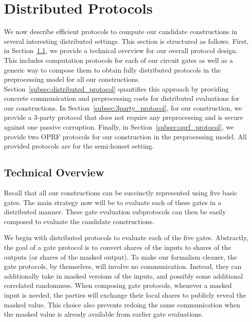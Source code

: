 \newpage
\section{Distributed Protocols}
\label{sec:distributed_protocols}
We now describe efficient protocols to compute our candidate constructions in several interesting distributed settings. This section is structured as follows. First, in Section~\ref{subsec:protocol_overview}, we provide a technical overview for our overall protocol design. This includes computation protocols for each of our circuit gates as well as a generic way to compose them to obtain fully distributed protocols in the preprocessing model for all our constructions. Section~\ref{subsec:distributed_protocol} quantifies this approach by providing concrete communication and preprocessing costs for distributed evaluations for our constructions. In Section~\ref{subsec:3party_protocol}, for our \ttwPRF construction, we provide a 3-party protocol that does not require any preprocessing and is secure against one passive corruption. Finally, in Section~\ref{subsec:oprf_protocol}, we provide two OPRF protocols for our \ttwPRF construction in the preprocessing model. All provided protocols are for the semi-honest setting.

\subsection{Technical Overview}
\label{subsec:protocol_overview}
Recall that all our constructions can be succinctly represented using five basic gates. The main strategy now will be to evaluate each of these gates in a distributed manner. These gate evaluation subprotocols can then be easily composed to evaluate the  candidate constructions. 

We begin with distributed protocols to evaluate each of the five gates. Abstractly, the goal of a gate protocol is to convert shares of the inputs to shares of the outputs (or shares of the masked output). To make our formalism cleaner, the gate protocols, by themselves, will involve no communication. Instead, they can additionally take in masked versions of the inputs, and possibly some additional correlated randomness. When composing gate protocols, whenever a masked input is needed, the parties will exchange their local shares to publicly reveal the masked value. This choice also prevents redoing the same communication when the masked value is already available from earlier gate evaluations.


